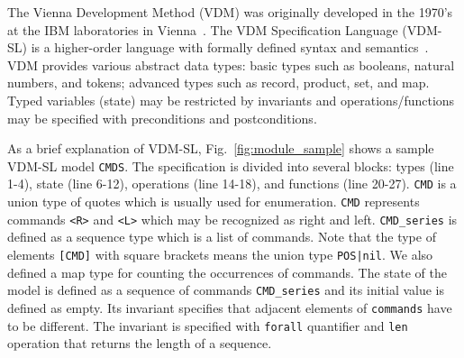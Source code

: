 
The Vienna Development Method (VDM) was originally developed in the 1970's at the IBM laboratories in Vienna~\cite{DBLP:conf/fm/1978}. The VDM Specification Language (VDM-SL) is a higher-order language with formally defined syntax and semantics~\cite{Prehn:1991:LNCS551,Larsen1995585}. VDM provides various abstract data types: basic types such as booleans, natural numbers, and tokens; advanced types such as record, product, set, and map. Typed variables (state) may be restricted by invariants and operations/functions may be specified with preconditions and postconditions.

As a brief explanation of VDM-SL, Fig.~\ref{fig:module_sample} shows a sample VDM-SL model {\tt CMDS}. The specification is divided into several blocks: types (line 1-4), state (line 6-12), operations (line 14-18), and functions (line 20-27). {\tt CMD} is a union type of quotes which is usually used for enumeration. {\tt CMD} represents commands {\tt <R>} and {\tt <L>} which may be recognized as right and left. {\tt CMD\_series} is defined as a sequence type which is a list of commands. Note that the type of elements {\tt [CMD]} with square brackets means the union type {\tt POS|nil}. We also defined a map type for counting the occurrences of commands. The state of the model is defined as a sequence of commands {\tt CMD\_series} and its initial value is defined as empty. Its invariant specifies that adjacent elements of {\tt commands} have to be different. The invariant is specified with {\tt forall} quantifier and {\tt len} operation that returns the length of a sequence.


